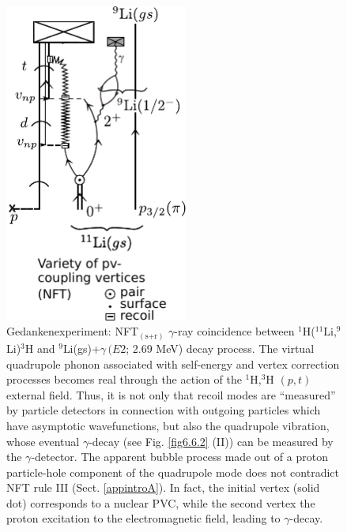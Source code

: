           \begin{figure}
          \centerline {
          \includegraphics*[width=6cm]{introduccion/figs/figintro6xxx}
          }
          \caption[$^1$H($^{11}$Li,$^9$Li)$^3$H and $^9$Li(gs)+$\gamma\, (E2$; 2.69 MeV) decay process.]{ Gedankenexperiment: NFT$_{(\text{s+r})}$ $\gamma$-ray coincidence between  $^1$H($^{11}$Li,$^9$Li)$^3$H and $^9$Li(gs)+$\gamma\, (E2$; 2.69 MeV) decay process. The virtual quadrupole phonon associated with self-energy and vertex correction processes becomes real through the action of the $^1$H,$^3$H $(p,t)$ external field. Thus, it is not only that recoil modes are ``measured'' by particle  detectors in connection with outgoing particles which have  asymptotic wavefunctions, but also the quadrupole vibration, whose eventual $\gamma$-decay (see Fig. \ref{fig6.6.2} (II)) can be  measured by the $\gamma$-detector. The apparent bubble process made out of a proton particle-hole component of the quadrupole mode does not contradict NFT rule III (Sect. \ref{appintroA}). In fact, the initial vertex (solid dot) corresponds to a nuclear PVC, while the second vertex the proton excitation to the electromagnetic field, leading to  $\gamma$-decay. }
          \label{figintro6x}
          \end{figure}
